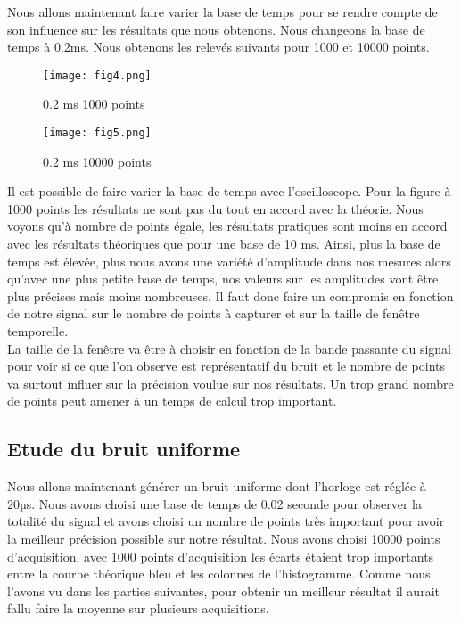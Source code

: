 \documentclass[oneside,a4paper,12pt]{article}
\begin{document}
	Nous allons maintenant faire varier la base de temps pour se rendre compte de son influence sur les résultats que nous obtenons. Nous changeons la base de temps à 0.2ms. Nous obtenons les relevés suivants pour 1000 et 10000 points.\\
	
	\begin{figure}[h]
		\centering
		\texttt{[image: fig4.png]}
		\caption{0.2 ms 1000 points}
	\end{figure}
\newpage

	\begin{figure}[h]
		\centering
		\texttt{[image: fig5.png]}
		\caption{0.2 ms 10000 points}
	\end{figure}
	
	Il est possible de faire varier la base de temps avec l’oscilloscope. Pour la figure à 1000 points les résultats ne sont pas du tout en accord avec la théorie. Nous voyons qu’à nombre de points égale, les résultats pratiques sont moins en accord avec les résultats théoriques que pour une base de 10 ms. Ainsi, plus la base de temps est élevée, plus nous avons une variété d’amplitude dans nos mesures alors qu’avec une plus petite base de temps, nos valeurs sur les amplitudes vont être plus précises mais moins nombreuses. Il faut donc faire un compromis en fonction de notre signal sur le nombre de points à capturer et sur la taille de fenêtre temporelle.\\
	La taille de la fenêtre va être à choisir en fonction de la bande passante du signal pour voir si ce que l’on observe est représentatif du bruit et le nombre de points va surtout influer sur la précision voulue sur nos résultats. Un trop grand nombre de points peut amener à un temps de calcul trop important.
	
	\newpage
	\subsection{Etude du bruit uniforme}
	
	Nous allons maintenant générer un bruit uniforme dont l’horloge est réglée à 20µs. Nous avons choisi une base de temps de 0.02 seconde pour observer la totalité du signal et avons choisi un nombre de points très important pour avoir la meilleur précision possible sur notre résultat. Nous avons choisi 10000 points d’acquisition, avec 1000 points d’acquisition les écarts étaient trop importants entre la courbe théorique bleu et les colonnes de l'histogramme. Comme nous l’avons vu dans les parties suivantes, pour obtenir un meilleur résultat il aurait fallu faire la moyenne sur plusieurs acquisitions.
	
\end{document}

